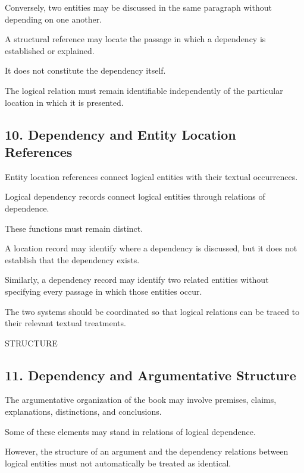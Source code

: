 Conversely, two entities may
be discussed in the same
paragraph without depending
on one another.

A structural reference may
locate the passage in which
a dependency is established
or explained.

It does not constitute the
dependency itself.

The logical relation must
remain identifiable independently
of the particular location
in which it is presented.


\subsection*{10. Dependency and Entity
Location References}

Entity location references
connect logical entities
with their textual occurrences.

Logical dependency records
connect logical entities
through relations of dependence.

These functions must remain
distinct.

A location record may identify
where a dependency is discussed,
but it does not establish
that the dependency exists.

Similarly, a dependency record
may identify two related
entities without specifying
every passage in which those
entities occur.

The two systems should be
coordinated so that logical
relations can be traced
to their relevant textual
treatments.

STRUCTURE

\subsection*{11. Dependency and Argumentative
Structure}

The argumentative organization
of the book may involve
premises, claims, explanations,
distinctions, and conclusions.

Some of these elements may
stand in relations of logical
dependence.

However, the structure of
an argument and the dependency
relations between logical
entities must not automatically
be treated as identical.

